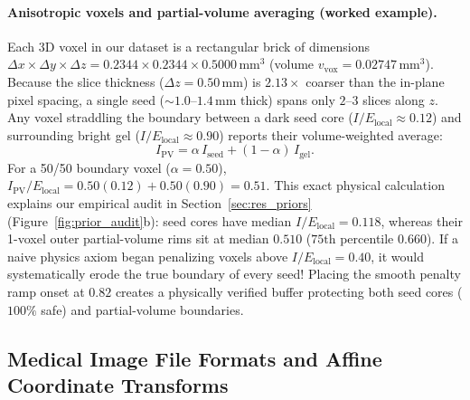 \documentclass[10pt,a4paper]{article}
\renewcommand{\_}{\origunderscore\allowbreak}
\begin{document}
\paragraph{Anisotropic voxels and partial-volume averaging (worked example).} Each 3D voxel in our dataset is a rectangular brick of dimensions $\Delta x \times \Delta y \times \Delta z = 0.2344 \times 0.2344 \times 0.5000\,\text{mm}^3$ (volume $v_{\text{vox}} = 0.02747\,\text{mm}^3$). Because the slice thickness ($\Delta z = 0.50\,\text{mm}$) is $2.13\times$ coarser than the in-plane pixel spacing, a single seed ($\sim 1.0\text{--}1.4\,\text{mm}$ thick) spans only $2\text{--}3$ slices along $z$. Any voxel straddling the boundary between a dark seed core ($I/E_{\text{local}} \approx 0.12$) and surrounding bright gel ($I/E_{\text{local}} \approx 0.90$) reports their volume-weighted average:
\begin{equation}
    I_{\text{PV}} = \alpha\,I_{\text{seed}} + (1 - \alpha)\,I_{\text{gel}}.
\end{equation}
For a 50/50 boundary voxel ($\alpha = 0.50$), $I_{\text{PV}}/E_{\text{local}} = 0.50(0.12) + 0.50(0.90) = 0.51$. This exact physical calculation explains our empirical audit in Section~\ref{sec:res_priors} (Figure~\ref{fig:prior_audit}b): seed cores have median $I/E_{\text{local}} = 0.118$, whereas their 1-voxel outer partial-volume rims sit at median $0.510$ ($75\text{th}$ percentile $0.660$). If a naive physics axiom began penalizing voxels above $I/E_{\text{local}} = 0.40$, it would systematically erode the true boundary of every seed! Placing the smooth penalty ramp onset at $0.82$ creates a physically verified buffer protecting both seed cores ($100\%$ safe) and partial-volume boundaries.

\subsection{Medical Image File Formats and Affine Coordinate Transforms}
\end{document}

